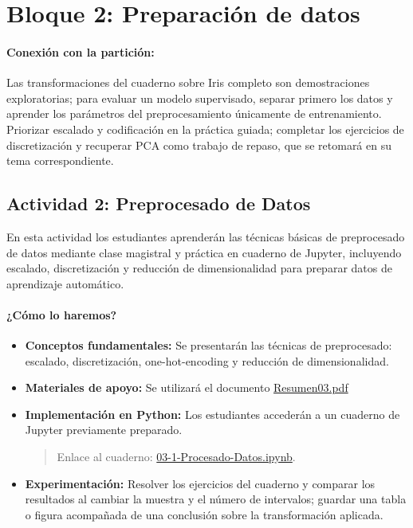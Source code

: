 \documentclass[a4,11pt]{aleph-notas}
\begin{document}
\section*{Bloque 2: Preparación de datos}
\paragraph{Conexión con la partición:} Las transformaciones del cuaderno sobre Iris completo son demostraciones exploratorias; para evaluar un modelo supervisado, separar primero los datos y aprender los parámetros del preprocesamiento únicamente de entrenamiento. Priorizar escalado y codificación en la práctica guiada; completar los ejercicios de discretización y recuperar PCA como trabajo de repaso, que se retomará en su tema correspondiente.
\subsection*{Actividad 2: Preprocesado de Datos}

En esta actividad los estudiantes aprenderán las técnicas básicas de preprocesado de datos mediante clase magistral y práctica en cuaderno de Jupyter, incluyendo escalado, discretización y reducción de dimensionalidad para preparar datos de aprendizaje automático.

\paragraph{¿Cómo lo haremos?}
\begin{itemize}[leftmargin=*]
    \item \textbf{Conceptos fundamentales:}
    Se presentarán las técnicas de preprocesado: escalado, discretización, one-hot-encoding y reducción de dimensionalidad.
    \item \textbf{Materiales de apoyo:}
    Se utilizará el documento \href{https://andres-merino.github.io/AprendizajeAutomaticoInicial-05-N0105/2-Resumenes/Resumen03.pdf}{Resumen03.pdf}
    \item \textbf{Implementación en Python:} Los estudiantes accederán a un cuaderno de Jupyter previamente preparado.
    \begin{quote}
        Enlace al cuaderno: \href{https://colab.research.google.com/github/andres-merino/AprendizajeAutomaticoInicial-05-N0105/blob/main/2-Notebooks/03-1-Procesado-Datos.ipynb}{03-1-Procesado-Datos.ipynb}.
    \end{quote}
    \item \textbf{Experimentación:} Resolver los ejercicios del cuaderno y comparar los resultados al cambiar la muestra y el número de intervalos; guardar una tabla o figura acompañada de una conclusión sobre la transformación aplicada.

\end{itemize}
\end{document}
